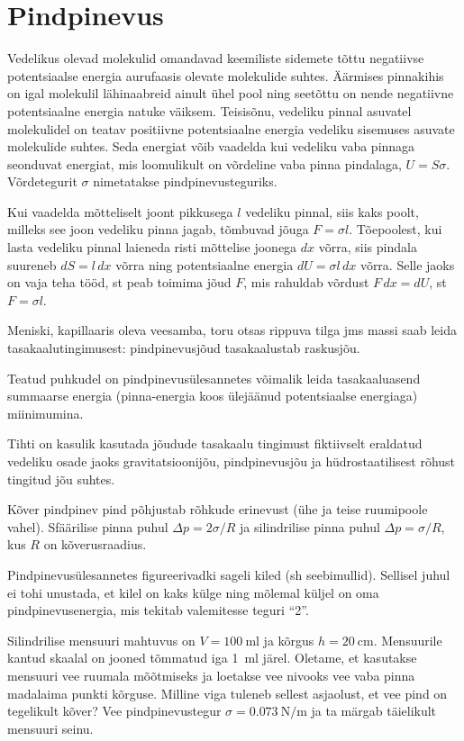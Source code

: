 \documentclass[a4paper,11pt,twocolumn]{article}
\begin{document}
\section{Pindpinevus}
Vedelikus olevad molekulid omandavad keemiliste sidemete tõttu negatiivse potentsiaalse energia aurufaasis olevate molekulide suhtes. Äärmises pinnakihis on igal molekulil lähinaabreid ainult ühel pool ning seetõttu on nende negatiivne potentsiaalne energia natuke väiksem. Teisisõnu, vedeliku pinnal asuvatel molekulidel on teatav positiivne potentsiaalne energia vedeliku sisemuses asuvate molekulide suhtes. Seda energiat võib vaadelda kui vedeliku vaba pinnaga seonduvat energiat, mis loomulikult on võrdeline vaba pinna pindalaga, \( U = S\sigma \). Võrdetegurit \( \sigma \) nimetatakse pindpinevusteguriks.

Kui vaadelda mõtteliselt joont pikkusega \( l \) vedeliku pinnal, siis kaks poolt, milleks see joon vedeliku pinna jagab, tõmbuvad jõuga \( F = \sigma l \). Tõepoolest, kui lasta vedeliku pinnal
laieneda risti mõttelise joonega \( dx \) võrra, siis
pindala suureneb \( dS = l\,dx \) võrra ning potentsiaalne energia
\( dU = \sigma l\,dx \) võrra. Selle jaoks on vaja teha tööd, st peab toimima jõud \( F \), mis rahuldab võrdust \( F\,dx = dU \), st \( F = \sigma l \).

Meniski, kapillaaris oleva veesamba, toru otsas rippuva tilga jms massi saab leida tasakaalutingimusest: pindpinevusjõud tasakaalustab raskusjõu.

Teatud puhkudel on pindpinevusülesannetes võimalik leida tasakaaluasend summaarse energia (pinna-energia koos ülejäänud potentsiaalse energiaga) miinimumina.

Tihti on kasulik kasutada jõudude tasakaalu tingimust fiktiivselt eraldatud vedeliku osade jaoks gravitatsioonijõu, pindpinevusjõu ja hüdrostaatilisest rõhust tingitud jõu suhtes.

Kõver pindpinev pind põhjustab rõhkude erinevust (ühe ja teise ruumipoole vahel). Sfäärilise pinna puhul \( \Delta p = 2\sigma/R \) ja silindrilise pinna puhul \( \Delta p = \sigma/R \), kus \( R \) on kõverusraadius.

Pindpinevusülesannetes figureerivadki sageli kiled (sh seebimullid). Sellisel juhul ei tohi unustada, et kilel on kaks külge ning mõlemal küljel on oma pindpinevusenergia, mis tekitab valemitesse teguri \enquote{2}.

\begin{question}
	Silindrilise mensuuri mahtuvus on \( V = \SI{100}{\ml} \) ja kõrgus \( h = \SI{20}{\cm} \). Mensuurile kantud skaalal on jooned tõmmatud iga \SI{1}{\ml} järel. Oletame, et kasutakse mensuuri vee ruumala mõõtmiseks ja loetakse vee nivooks vee vaba pinna madalaima punkti kõrguse. Milline viga tuleneb sellest asjaolust, et vee pind on tegelikult kõver? Vee pindpinevustegur \( \sigma = \SI{0,073}{\N\per\m} \) ja ta märgab täielikult mensuuri seinu.
\end{question}
\end{document}
